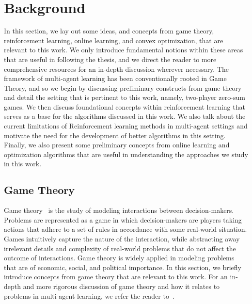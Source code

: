 \chapter{Background}
In this section, we lay out some ideas, and concepts from game theory, reinforcement learning,
online learning, and convex optimization, that are relevant to this work.
We only introduce fundamental notions within these areas that are useful in following the thesis,
and we direct the reader to more comprehensive resources for an in-depth discussion wherever
necessary.
The framework of multi-agent learning has been conventionally rooted in Game Theory, and so we
begin by discussing preliminary constructs from game theory and detail the setting that is
pertinent to this work, namely, two-player zero-sum games.
We then discuss foundational concepts within reinforcement learning that serves as a base for the
algorithms discussed in this work.
We also talk about the current limitations of Reinforcement learning methods in multi-agent
settings and motivate the need for the development of better algorithms in this setting.
Finally, we also present some preliminary concepts from online learning and optimization algorithms
that are useful in understanding the approaches we study in this work.

\section{Game Theory}
Game theory~\cite{osborneintroduction2004} is the study of modeling interactions between
decision-makers.
Problems are represented as a game in which decision-makers are players taking actions that adhere
to a set of rules in accordance with some real-world situation.
Games intuitively capture the nature of the interaction, while abstracting away irrelevant details
and complexity of real-world problems that do not affect the outcome of interactions.
Game theory is widely applied in modeling problems that are of economic, social, and political
importance.
In this section, we briefly introduce concepts from game theory that are relevant to this work.
For an in-depth and more rigorous discussion of game theory and how it relates to problems in
multi-agent learning, we refer the reader to~\cite{nisanAlgorithmic2007a, shohamMultiagent2008}.

